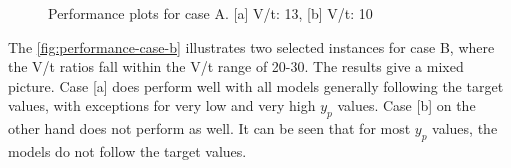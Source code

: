 \begin{figure}[hb]
    \begin{tcolorbox}[arc=0pt,boxrule=0.5pt]
        \centering
        \caption{Performance plots for case A. [a] V/t: 13, [b] V/t: 10}
        \label{fig:performance-case-a}
    \end{tcolorbox}
\end{figure}

The \cref{fig:performance-case-b} illustrates two selected instances for case B, where the V/t ratios fall within
the V/t range of 20-30.
The results give a mixed picture.
Case [a] does perform well with all models generally following the target values, with exceptions for very
low
and
very high $y_p$ values.
Case [b] on the other hand does not perform as well. It can be seen that for most $y_p$ values, the models do not
follow the target values.


